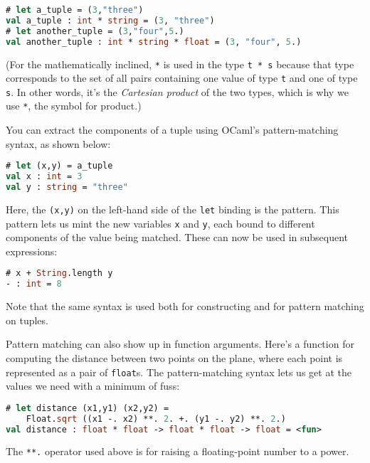 \begin{lstlisting}[language=Caml]
# let a_tuple = (3,"three")
val a_tuple : int * string = (3, "three")
# let another_tuple = (3,"four",5.)
val another_tuple : int * string * float = (3, "four", 5.)
\end{lstlisting}

(For the mathematically inclined, \passthrough{\lstinline!*!} is used in
the type \passthrough{\lstinline!t * s!} because that type corresponds
to the set of all pairs containing one value of type
\passthrough{\lstinline!t!} and one of type \passthrough{\lstinline!s!}.
In other words, it's the \emph{Cartesian product} of the two types,
which is why we use \passthrough{\lstinline!*!}, the symbol for
product.)

You can extract the components of a tuple using OCaml's pattern-matching
syntax, as shown below:

\begin{lstlisting}[language=Caml]
# let (x,y) = a_tuple
val x : int = 3
val y : string = "three"
\end{lstlisting}

Here, the \passthrough{\lstinline!(x,y)!} on the left-hand side of the
\passthrough{\lstinline!let!} binding is the pattern. This pattern lets
us mint the new variables \passthrough{\lstinline!x!} and
\passthrough{\lstinline!y!}, each bound to different components of the
value being matched. These can now be used in subsequent expressions:

\begin{lstlisting}[language=Caml]
# x + String.length y
- : int = 8
\end{lstlisting}

Note that the same syntax is used both for constructing and for pattern
matching on tuples.

Pattern matching can also show up in function arguments. Here's a
function for computing the distance between two points on the plane,
where each point is represented as a pair of
\passthrough{\lstinline!float!}s. The pattern-matching syntax lets us
get at the values we need with a minimum of fuss:

\begin{lstlisting}[language=Caml]
# let distance (x1,y1) (x2,y2) =
    Float.sqrt ((x1 -. x2) **. 2. +. (y1 -. y2) **. 2.)
val distance : float * float -> float * float -> float = <fun>
\end{lstlisting}

The \passthrough{\lstinline!**.!} operator used above is for raising a
floating-point number to a power.

